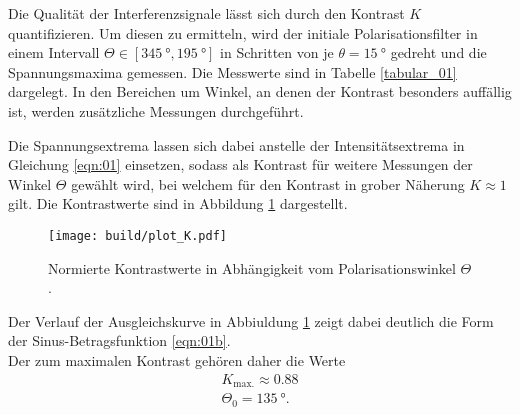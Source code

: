 \noindent Die Qualität der Interferenzsignale lässt sich durch den Kontrast $K$
quantifizieren. Um diesen zu ermitteln, wird der initiale Polarisationsfilter
in einem Intervall $\Theta \in [\SI{345}{\degree}, \SI{195}{\degree}]$
in Schritten von je $\theta = \SI{15}{\degree}$ gedreht und die Spannungsmaxima
gemessen. Die Messwerte sind in Tabelle \ref{tabular_01} dargelegt. In den
Bereichen um Winkel, an denen der Kontrast besonders auffällig ist, werden
zusätzliche Messungen durchgeführt. \\
\FloatBarrier

\FloatBarrier
\noindent Die Spannungsextrema lassen sich dabei anstelle der Intensitätsextrema
in Gleichung \ref{eqn:01} einsetzen, sodass als Kontrast für weitere Messungen
der Winkel $\Theta$ gewählt wird, bei welchem für den Kontrast in grober Näherung
$K \approx 1$ gilt. Die Kontrastwerte sind in Abbildung \ref{fig:02} dargestellt.
\FloatBarrier
\begin{figure}
  \centering
  \texttt{[image: build/plot\_K.pdf]}
  \caption{Normierte Kontrastwerte in Abhängigkeit vom Polarisationswinkel $\Theta$.}
  \label{fig:02}
\end{figure}
\FloatBarrier
\noindent Der Verlauf der Ausgleichskurve in Abbiuldung \ref{fig:02} zeigt dabei
deutlich die Form der Sinus-Betragsfunktion \ref{eqn:01b}. \\
\noindent Der zum maximalen Kontrast gehören daher die Werte
\begin{align*}
  K_\text{max.} \approx \num{0.88} \\
  \Theta_0 = \SI{135}{\degree}.
\end{align*}

